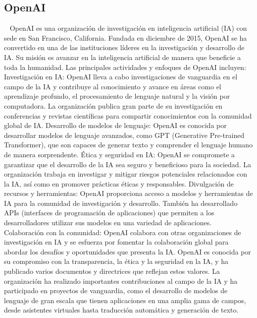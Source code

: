 \subsection{OpenAI}~\cite{chatgpt1}
OpenAI es una organización de investigación en inteligencia artificial (IA) con sede en San Francisco, California. Fundada en diciembre de 2015, OpenAI se ha convertido en una de las instituciones líderes en la investigación y desarrollo de IA. Su misión es avanzar en la inteligencia artificial de manera que beneficie a toda la humanidad.
Las principales actividades y enfoques de OpenAI incluyen:
Investigación en IA: OpenAI lleva a cabo investigaciones de vanguardia en el campo de la IA y contribuye al conocimiento y avance en áreas como el aprendizaje profundo, el procesamiento de lenguaje natural y la visión por computadora. La organización publica gran parte de su investigación en conferencias y revistas científicas para compartir conocimientos con la comunidad global de IA.
Desarrollo de modelos de lenguaje: OpenAI es conocida por desarrollar modelos de lenguaje avanzados, como GPT (Generative Pre-trained Transformer), que son capaces de generar texto y comprender el lenguaje humano de manera sorprendente.
Ética y seguridad en IA: OpenAI se compromete a garantizar que el desarrollo de la IA sea seguro y beneficioso para la sociedad. La organización trabaja en investigar y mitigar riesgos potenciales relacionados con la IA, así como en promover prácticas éticas y responsables.
Divulgación de recursos y herramientas: OpenAI proporciona acceso a modelos y herramientas de IA para la comunidad de investigación y desarrollo. También ha desarrollado APIs (interfaces de programación de aplicaciones) que permiten a los desarrolladores utilizar sus modelos en una variedad de aplicaciones.
Colaboración con la comunidad: OpenAI colabora con otras organizaciones de investigación en IA y se esfuerza por fomentar la colaboración global para abordar los desafíos y oportunidades que presenta la IA.
OpenAI es conocida por su compromiso con la transparencia, la ética y la seguridad en la IA, y ha publicado varios documentos y directrices que reflejan estos valores. La organización ha realizado importantes contribuciones al campo de la IA y ha participado en proyectos de vanguardia, como el desarrollo de modelos de lenguaje de gran escala que tienen aplicaciones en una amplia gama de campos, desde asistentes virtuales hasta traducción automática y generación de texto.
